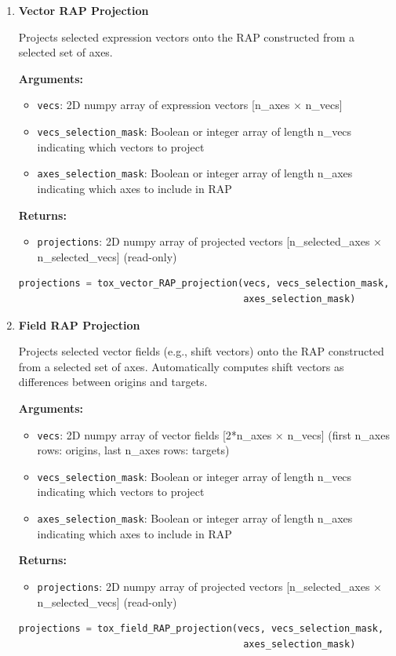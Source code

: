 \documentclass[11pt]{article}
\begin{document}
\begin{enumerate}
    \item \textbf{Vector RAP Projection}

    Projects selected expression vectors onto the RAP constructed from a selected set of axes.
    
    \textbf{Arguments:}
    \begin{itemize}
        \item \texttt{vecs}: 2D numpy array of expression vectors [n\_axes × n\_vecs]
        \item \texttt{vecs\_selection\_mask}: Boolean or integer array of length n\_vecs indicating which vectors to project
        \item \texttt{axes\_selection\_mask}: Boolean or integer array of length n\_axes indicating which axes to include in RAP
    \end{itemize}
    \textbf{Returns:}
    \begin{itemize}
        \item \texttt{projections}: 2D numpy array of projected vectors [n\_selected\_axes × n\_selected\_vecs] (read-only)
    \end{itemize}
\begin{lstlisting}[language=Python, caption={Vector RAP Projection}]
projections = tox_vector_RAP_projection(vecs, vecs_selection_mask, 
                                        axes_selection_mask)
\end{lstlisting}

    \item \textbf{Field RAP Projection}

    Projects selected vector fields (e.g., shift vectors) onto the RAP constructed from a selected set of axes. Automatically computes shift vectors as differences between origins and targets.
    
    \textbf{Arguments:}
    \begin{itemize}
        \item \texttt{vecs}: 2D numpy array of vector fields [2*n\_axes × n\_vecs] (first n\_axes rows: origins, last n\_axes rows: targets)
        \item \texttt{vecs\_selection\_mask}: Boolean or integer array of length n\_vecs indicating which vectors to project
        \item \texttt{axes\_selection\_mask}: Boolean or integer array of length n\_axes indicating which axes to include in RAP
    \end{itemize}
    \textbf{Returns:}
    \begin{itemize}
        \item \texttt{projections}: 2D numpy array of projected vectors [n\_selected\_axes × n\_selected\_vecs] (read-only)
    \end{itemize}
\begin{lstlisting}[language=Python, caption={Vector Field RAP Projection}]
projections = tox_field_RAP_projection(vecs, vecs_selection_mask, 
                                        axes_selection_mask)
\end{lstlisting}


\end{enumerate}
\end{document}
